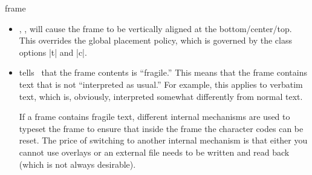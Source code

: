 \begin{environment}{{frame}%
    }
\begin{frame}[<+->][plain]
\begin{frame}[plain]
\begin{itemize}
    The use of this  option \emph{evil}. In a (good) presentation you
    prepare each slide carefully and think twice before putting something
    on a certain slide rather than on some different slide. Using the
    |allowframebreaks| option invites the creation of horrible, endless
    presentations that resemble more a ``paper projected on the wall''
    than a presentation. Nevertheless, the option does have its
    uses. Most noticeably, it can be convenient for automatically
    splitting bibliographies or long equations.

    \example
\begin{verbatim}
\begin{frame}[allowframebreaks]
  \frametitle{References}

  \begin{thebibliography}{XX}

  \bibitem...
  \bibitem...
    ...
  \bibitem...
  \end{thebibliography}
\end{frame}
\end{verbatim}
    \example
\begin{verbatim}
\begin{frame}[allowframebreaks,allowdisplaybreaks]
  \frametitle{A Long Equation}

  \begin{align}
    \zeta(2) &= 1 + 1/4 + 1/9 + \cdots \\
    &= ... \\
    ...
    &= \pi^2/6.
  \end{align}
\end{frame}
\end{verbatim}
  \item
    , ,  will cause the frame
    to be vertically aligned at the bottom/center/top. This overrides
    the global placement policy, which is governed by the class
    options |t| and |c|.
  \item
     tells \beamer\
    that the frame contents is ``fragile.'' This means that the frame
    contains text that is not ``interpreted as usual.'' For example,
    this applies to verbatim text, which is, obviously, interpreted
    somewhat differently from normal text.

    If a frame contains fragile text, different internal mechanisms
    are used to typeset the frame to ensure that inside the frame the
    character codes can be reset. The price of switching to another
    internal mechanism is that either you cannot use overlays or an
    external file needs to be written and read back (which is not
    always desirable).


\end{itemize}
\end{frame}
\end{frame}
\end{environment}
